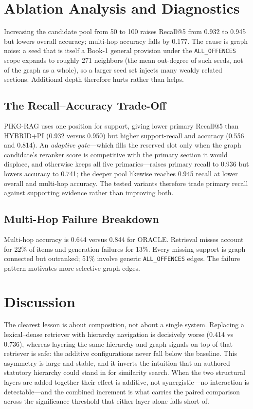 \documentclass[conference]{IEEEtran}
\begin{document}
\section{Ablation Analysis and Diagnostics}
\label{sec:ablations}

Increasing the candidate pool from 50 to 100 raises Recall@5 from 0.932 to 0.945 but lowers overall
accuracy; multi-hop accuracy falls by 0.177. The cause is graph noise: a seed that is itself a Book-1
general provision under the \texttt{ALL\_OFFENCES} scope expands to roughly 271 neighbors (the mean
out-degree of such seeds, not of the graph as a whole), so a larger seed set injects many weakly
related sections. Additional depth therefore hurts rather than helps.

\subsection{The Recall--Accuracy Trade-Off}

PIKG-RAG uses one position for support, giving lower primary Recall@5 than HYBRID+PI (0.932 versus
0.950) but higher support-recall and accuracy (0.556 and 0.814). An \emph{adaptive gate}---which
fills the reserved slot only when the graph candidate's reranker score is competitive with the
primary section it would displace, and otherwise keeps all five primaries---raises primary recall to
0.936 but lowers accuracy to 0.741; the deeper pool likewise reaches 0.945 recall at lower overall
and multi-hop accuracy. The tested variants therefore trade primary recall against supporting
evidence rather than improving both.

\subsection{Multi-Hop Failure Breakdown}

Multi-hop accuracy is 0.644 versus 0.844 for ORACLE. Retrieval misses account for 22\% of items and
generation failures for 13\%. Every missing support is graph-connected but outranked; 51\% involve
generic \texttt{ALL\_OFFENCES} edges. The failure pattern motivates more selective graph edges.

\section{Discussion}
\label{sec:discussion}

The clearest lesson is about composition, not about a single system. Replacing a lexical--dense
retriever with hierarchy navigation is decisively worse (0.414 vs 0.736), whereas layering the same
hierarchy and graph signals on top of that retriever is safe: the additive configurations never fall
below the baseline. This asymmetry is large and stable, and it inverts the intuition that an authored
statutory hierarchy could stand in for similarity search. When the two structural layers are added
together their effect is additive, not synergistic---no interaction is detectable---and the combined
increment is what carries the paired comparison across the significance threshold that either layer
alone falls short of.
\end{document}

